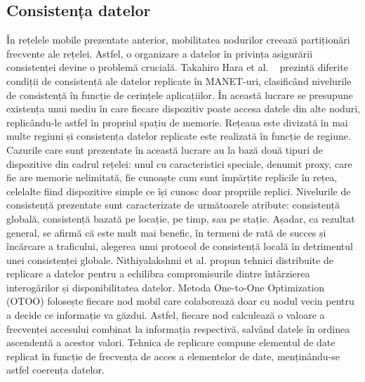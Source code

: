\documentclass[12pt,a4paper]{report}
\begin{document}
\subsection{Consistența datelor}
În rețelele mobile prezentate anterior, mobilitatea nodurilor creează partiționări frecvente ale rețelei. Astfel, o organizare a datelor în privința asigurării consistenței devine o problemă crucială. Takahiro Hara et al. ~\cite{hara2009consistency} prezintă diferite condiții de consistență ale datelor replicate în MANET-uri, clasificând nivelurile de consistență în funcție de cerințele aplicațiilor. În această lucrare se presupune existența unui mediu în care fiecare dispozitiv poate accesa datele din alte noduri, replicându-le astfel în propriul spațiu de memorie. Rețeaua este divizată în mai multe regiuni și consistența datelor replicate este realizată în funcție de regiune. Cazurile care sunt prezentate în această lucrare au la bază două tipuri de dispozitive din cadrul rețelei: unul cu caracteristici speciale, denumit proxy, care fie are memorie nelimitată, fie cunoaște cum sunt împărțite replicile în rețea, celelalte fiind dispozitive simple ce își cunosc doar propriile replici. Nivelurile de consistență prezentate sunt caracterizate de următoarele atribute: consistență globală, consistență bazată pe locație, pe timp, sau pe stație. Așadar, ca rezultat general, se afirmă că este mult mai benefic, în termeni de rată de succes și încărcare a traficului, alegerea unui protocol de consistență locală în detrimentul unei consistenței globale.
Nithiyalakshmi et al.\cite{nithiyalakshmi2014data} propun tehnici distribuite de replicare a datelor pentru a echilibra compromisurile dintre întârzierea interogărilor și disponibilitatea datelor. Metoda One-to-One Optimization (OTOO) folosește fiecare nod mobil care colaborează doar cu nodul vecin pentru a decide ce informație va găzdui. Astfel, fiecare nod calculează o valoare a frecvenței accesului combinat la informația respectivă, salvând datele în ordinea ascendentă a acestor valori. Tehnica de replicare compune elementul de date replicat în funcție de frecvența de acces a elementelor de date, menținându-se astfel coerența datelor.
\end{document}

